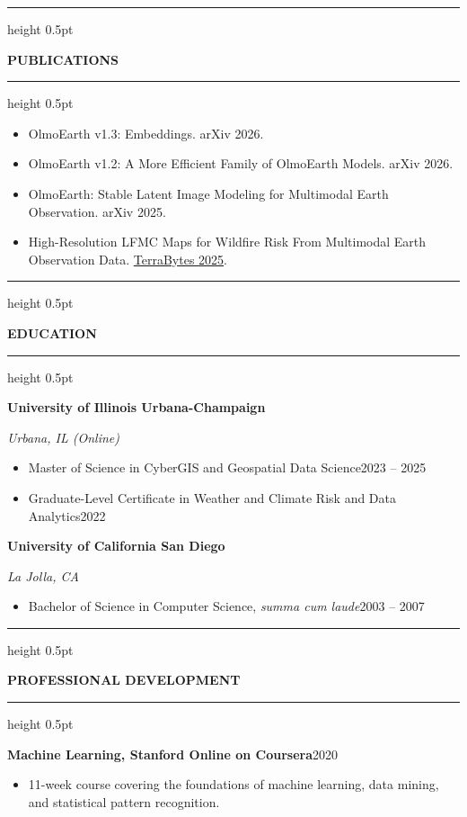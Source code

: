 \documentclass[10pt,letterpaper]{article}
\newcommand{\ressection}[1]{%
  \vspace{3pt}%
  {\color{rulecolor}\hrule height 0.5pt}%
  \vspace{3pt}%
  {\normalsize\bfseries\color{sectionblue}#1}%
  \vspace{3pt}%
  {\color{rulecolor}\hrule height 0.5pt}%
  \vspace{3pt}%
}
\newcommand{\jobheader}[2]{%
  \vspace{3pt}%
  \hspace{1em}\textbf{#1}\hfill#2%
  \vspace{1pt}%
}
\begin{document}
\ressection{PUBLICATIONS}

\begin{itemize}
  \item OlmoEarth v1.3: Embeddings. arXiv 2026.
  \item OlmoEarth v1.2: A More Efficient Family of OlmoEarth Models. arXiv 2026.
  \item OlmoEarth: Stable Latent Image Modeling for Multimodal Earth Observation. arXiv 2025.
  \item High-Resolution LFMC Maps for Wildfire Risk From Multimodal Earth Observation Data. \href{https://proceedings.mlr.press/v292/}{TerraBytes 2025}.
\end{itemize}

\ressection{EDUCATION}

\jobheader{University of Illinois Urbana-Champaign}{}
\par\hspace{1em}\textit{Urbana, IL (Online)}

\begin{itemize}
  \item Master of Science in CyberGIS and Geospatial Data Science\hfill 2023 -- 2025
  \item Graduate-Level Certificate in Weather and Climate Risk and Data Analytics\hfill 2022
\end{itemize}

\jobheader{University of California San Diego}{}
\par\hspace{1em}\textit{La Jolla, CA}

\begin{itemize}
  \item Bachelor of Science in Computer Science, \textit{summa cum laude}\hfill 2003 -- 2007
\end{itemize}

\ressection{PROFESSIONAL DEVELOPMENT}

\jobheader{Machine Learning, Stanford Online on Coursera}{2020}

\begin{itemize}
  \item 11-week course covering the foundations of machine learning, data mining, and statistical pattern recognition.
\end{itemize}
\end{document}
